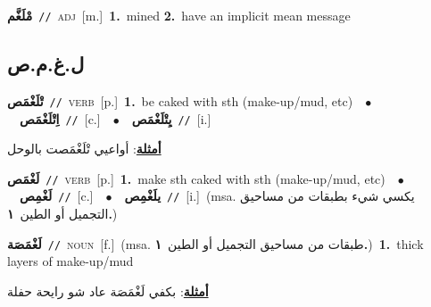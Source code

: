 \documentclass[10pt,a4paper,twoside]{article} %
\begin{document}
\begin{multicols}{2}
{\setlength\topsep{0pt}\textbf{\foreignlanguage{arabic}{مْلَغَّم}}\ {\color{gray}\texttt{//}\color{black}}\ \textsc{adj}\ [m.]\ \textbf{1.}~mined  \textbf{2.}~have an implicit mean message\ } \vspace{2mm}

\vspace{-3mm}
\subsection*{\color{blue}\foreignlanguage{arabic}{ل.غ.م.ص}\color{blue}{}} 

{\setlength\topsep{0pt}\textbf{\foreignlanguage{arabic}{تْلَغْمَص}}\ {\color{gray}\texttt{//}\color{black}}\ \textsc{verb}\ [p.]\ \textbf{1.}~be caked with sth (make-up/mud, etc)\ \ $\bullet$\ \ \setlength\topsep{0pt}\textbf{\foreignlanguage{arabic}{اِتْلَغْمَص}}\ {\color{gray}\texttt{//}\color{black}}\ [c.]\ \ $\bullet$\ \ \setlength\topsep{0pt}\textbf{\foreignlanguage{arabic}{يِتْلَغْمَص}}\ {\color{gray}\texttt{//}\color{black}}\ [i.]\  \begin{flushright}\color{gray}\foreignlanguage{arabic}{\textbf{\underline{\foreignlanguage{arabic}{أمثلة}}}: أواعيي تْلَغْمَصت بالوحل}\end{flushright}\color{black}} \vspace{2mm}

{\setlength\topsep{0pt}\textbf{\foreignlanguage{arabic}{لَغْمَص}}\ {\color{gray}\texttt{//}\color{black}}\ \textsc{verb}\ [p.]\ \textbf{1.}~make sth caked with sth (make-up/mud, etc)\ \ $\bullet$\ \ \setlength\topsep{0pt}\textbf{\foreignlanguage{arabic}{لَغْمِص}}\ {\color{gray}\texttt{//}\color{black}}\ [c.]\ \ $\bullet$\ \ \setlength\topsep{0pt}\textbf{\foreignlanguage{arabic}{يلَغْمِص}}\ {\color{gray}\texttt{//}\color{black}}\ [i.]\ \color{gray}(msa. \foreignlanguage{arabic}{يكسي شيء بطبقات من مساحيق التجميل أو الطين}~\foreignlanguage{arabic}{\textbf{١.}})\color{black}\ } \vspace{2mm}

{\setlength\topsep{0pt}\textbf{\foreignlanguage{arabic}{لَغْمَصَة}}\ {\color{gray}\texttt{//}\color{black}}\ \textsc{noun}\ [f.]\ \color{gray}(msa. \foreignlanguage{arabic}{طبقات من مساحيق التجميل أو الطين}~\foreignlanguage{arabic}{\textbf{١.}})\color{black}\ \textbf{1.}~thick layers of make-up/mud\  \begin{flushright}\color{gray}\foreignlanguage{arabic}{\textbf{\underline{\foreignlanguage{arabic}{أمثلة}}}: بكفي لَغْمَصَة عاد شو رايحة حفلة}\end{flushright}\color{black}} \vspace{2mm}


\end{multicols}
\end{document}
